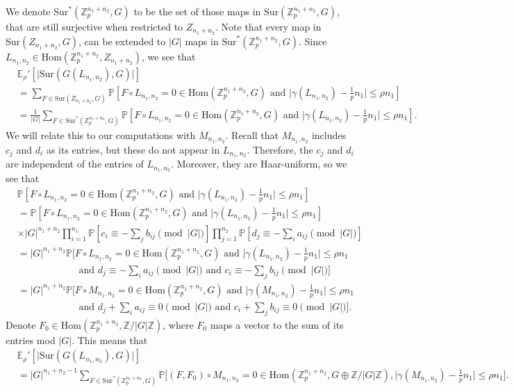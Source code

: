 \documentclass[12pt]{amsart}
\theoremstyle{definition}
\newcommand{\PPP}{\mathbb{P}}
\newcommand{\Mnot}{M_{n_1,n_2}}
\newcommand{\Lnot}{L_{n_1,n_2}}
\newcommand{\Erhop}{\E_{\rho}'}
\newcommand{\ZG}{\Z/\abs{G}\Z}
\newcommand{\abs}[1]{\vert#1\vert}
\newcommand{\Znot}{Z_{n_1+n_2}}
\newcommand{\Zpnot}{\Z_p^{n_1+n_2}}
\newcommand{\E}{\mathbb{E}}
\newcommand{\Z}{\mathbb{Z}}
\newcommand{\Hom}{\text{Hom}}
\newcommand{\Sur}{\text{Sur}}
\begin{document}
We denote $\Sur^*(\Zpnot,G)$ to be the set of those maps in $\Sur(\Zpnot,G)$, that are still surjective when restricted to $\Znot$. Note that every map in $\Sur(\Znot,G)$, can be extended to $|G|$ maps in $\Sur^*(\Zpnot,G)$.
Since $\Lnot\in \Hom(\Zpnot,\Znot)$, we see that
\begin{align*}
&\Erhop[\abs{\Sur(G(\Lnot),G)}]\\
&=\sum_{F\in\Sur(\Znot,G)} \PPP[F\circ \Lnot=0\in \Hom(\Zpnot,G) \text{ and }\abs{\gamma(\Lnot) -\tfrac{1}{p} n_1}\leq \rho n_1]\\
&=\frac{1}{\abs{G}} \sum_{F\in\Sur^*(\Zpnot,G)} \PPP[F\circ \Lnot=0\in \Hom(\Zpnot,G) \text{ and }\abs{\gamma(\Lnot) -\tfrac{1}{p} n_1}\leq \rho n_1].
\end{align*}
We will relate this to our computations with $\Mnot$.
Recall that $\Mnot$ includes $c_j$ and $d_i$ as its entries, but these do not appear in $\Lnot$. Therefore, the $c_j$ and $d_i$ are independent of the entries of $\Lnot$.
Moreover, they are Haar-uniform, so we see that
\begin{align*}
&\PPP[F\circ \Lnot=0\in \Hom(\Zpnot,G) \text{ and }\abs{\gamma(\Lnot) -\tfrac{1}{p} n_1}\leq \rho n_1]\\
&= \PPP[F\circ \Lnot=0\in \Hom(\Zpnot,G) \text{ and }\abs{\gamma(\Lnot) -\tfrac{1}{p} n_1}\leq \rho n_1]\\
&\times |G|^{n_1+n_2}
\prod_{i=1}^{n_1} \PPP[c_i\equiv -\sum_j b_{ij}\pmod{\abs{G}}] 
\prod_{j=1}^{n_2} \PPP[d_j\equiv -\sum_i a_{ij}\pmod{\abs{G}}]\\
&=|G|^{n_1+n_2}
\PPP\Big[F\circ \Lnot=0\in \Hom(\Zpnot,G) \text{ and }\abs{\gamma(\Lnot) -\tfrac{1}{p} n_1}\leq \rho n_1\\ 
&\quad\quad\quad\quad\quad\quad
\text{ and } d_j\equiv -\sum_i a_{ij}\pmod{\abs{G}}
\text{ and } c_i\equiv -\sum_j b_{ij}\pmod{\abs{G}}\Big]\\
&=|G|^{n_1+n_2}
\PPP\Big[F\circ \Mnot=0\in \Hom(\Zpnot,G) \text{ and }\abs{\gamma(\Mnot) -\tfrac{1}{p} n_1}\leq \rho n_1\\ 
&\quad\quad\quad\quad\quad\quad
\text{ and } d_j +\sum_i a_{ij} \equiv 0 \pmod{\abs{G}}
\text{ and } c_i +\sum_j b_{ij} \equiv 0\pmod{\abs{G}}\Big].
\end{align*}
Denote $F_0\in \Hom(\Zpnot,\ZG)$, where $F_0$ maps a vector to the sum of its entries mod $|G|$. This means that
\begin{align*}
&\Erhop[\abs{\Sur(G(\Lnot),G)}]\\
&\!\!\!=\abs{G}^{n_1+n_2-1}\!\!\!\!\!\!\!\!\!\!\!\!\!\!\! \sum_{F\in\Sur^*(\Zpnot,G)}\!\!\!\!\!\!\!\!\!\!\!\!
\PPP\Big[(F,F_0)\circ \Mnot=0\in \Hom(\Zpnot,G \oplus\ZG),\abs{\gamma(\Mnot) -\tfrac{1}{p} n_1}\leq \rho n_1\Big].
\end{align*}
\end{document}
